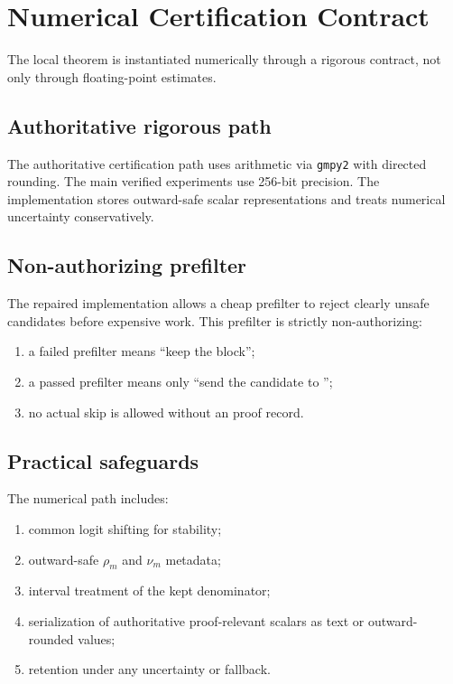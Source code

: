 \section{Numerical Certification Contract}
\label{app:numerics}

The local theorem is instantiated numerically through a rigorous contract, not only through floating-point estimates.

\subsection{Authoritative rigorous path}

The authoritative certification path uses \mpfr{} arithmetic via \texttt{gmpy2} with directed rounding. The main verified experiments use 256-bit precision. The implementation stores outward-safe scalar representations and treats numerical uncertainty conservatively.

\subsection{Non-authorizing \fp{} prefilter}

The repaired implementation allows a cheap \fp{} prefilter to reject clearly unsafe candidates before expensive \mpfr{} work. This prefilter is strictly non-authorizing:
\begin{enumerate}[label=\arabic*.]
  \item a failed prefilter means \enquote{keep the block};
  \item a passed prefilter means only \enquote{send the candidate to \mpfr{}};
  \item no actual skip is allowed without an \mpfr{} proof record.
\end{enumerate}

\subsection{Practical safeguards}

The numerical path includes:
\begin{enumerate}[label=\arabic*.]
  \item common logit shifting for stability;
  \item outward-safe $\rho_m$ and $\nu_m$ metadata;
  \item interval treatment of the kept denominator;
  \item serialization of authoritative proof-relevant scalars as text or outward-rounded values;
  \item retention under any uncertainty or fallback.
\end{enumerate}

